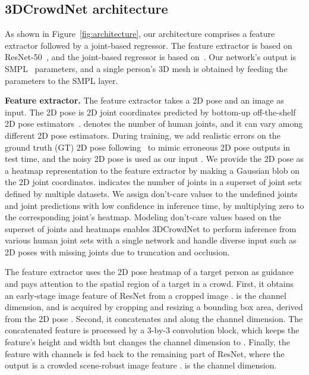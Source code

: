 \documentclass[10pt,twocolumn,letterpaper]{article}
\begin{document}
\subsection{3DCrowdNet architecture}
As shown in Figure~\ref{fig:architecture}, our architecture comprises a feature extractor followed by a joint-based regressor.
The feature extractor is based on ResNet-50~\cite{he2016deep}, and the joint-based regressor is based on~\cite{moon2020pose2pose,liu2020comprehensive}.
Our network's output is SMPL~\cite{loper2015smpl} parameters, and a single person's 3D mesh is obtained by feeding the parameters to the SMPL layer.



\noindent\textbf{Feature extractor.}
\label{section:prepare_2dpose}
The feature extractor takes a 2D pose and an image as input.
The 2D pose is 2D joint coordinates  predicted by bottom-up off-the-shelf 2D pose estimators~\cite{cao2017realtime,cheng2020higherhrnet}.
 denotes the number of human joints, and it can vary among different 2D pose estimators.
During training, we add realistic errors on the ground truth (GT) 2D pose following~\cite{moon2019posefix,choi2020p2m} to mimic erroneous 2D pose outputs in test time, and the noisy 2D pose is used as our input .
We provide the 2D pose  as a heatmap representation  to the feature extractor by making a Gaussian blob on the 2D joint coordinates.
 indicates the number of joints in a superset of joint sets defined by multiple datasets.
We assign don't-care values to the undefined joints and joint predictions with low confidence in inference time, by multiplying zero to the corresponding joint's heatmap.
Modeling don't-care values based on the superset of joints and heatmaps enables 3DCrowdNet to perform inference from various human joint sets with a single network and handle diverse input such as 2D poses with missing joints due to truncation and occlusion.


The feature extractor uses the 2D pose heatmap  of a target person as guidance and pays attention to the spatial region of a target in a crowd.
First, it obtains an early-stage image feature of ResNet  from a cropped image .
 is the channel dimension, and  is acquired by cropping and resizing a bounding box area, derived from the 2D pose .
Second, it concatenates  and  along the channel dimension.
The concatenated feature is processed by a 3-by-3 convolution block, which keeps the feature's height and width but changes the channel dimension to . 
Finally, the feature with  channels is fed back to the remaining part of ResNet, where the output is 
a crowded scene-robust image feature .
 is the channel dimension. 
\end{document}
